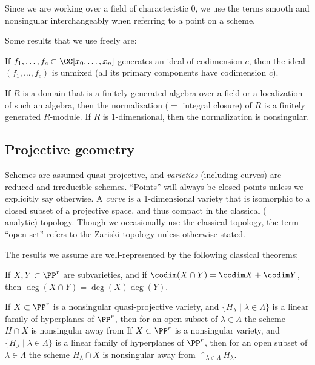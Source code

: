 Since we are working over  a field of characteristic 0, we use the terms smooth and nonsingular interchangeably when
referring to a point on a scheme.

Some results that we use freely are:
 \begin{theorem}\label{Lasker}
If $f_1,\dots, f_c \subset \CC[x_0,\dots, x_n]$ generates an ideal of codimension $c$, then 
the ideal $(f_1,\dots, f_c)$ is unmixed (all its primary components have codimension $c$).
\end{theorem}

\begin{theorem}\label{finiteness of normalization}
 If $R$ is a domain that is a finitely generated algebra over a field or a localization of such an algebra, then the
normalization ($=$ integral closure) of $R$ is a finitely generated $R$-module.
If $R$ is 1-dimensional, then the normalization is nonsingular.
\end{theorem}

\subsection{Projective geometry}
Schemes are assumed quasi-projective, and \emph{varieties} (including curves) are reduced and irreducible schemes. ``Points'' will always be closed points unless we explicitly say otherwise. A \emph{curve} is a 1-dimensional variety that is isomorphic to a closed subset of a projective space, and thus compact in the classical ($=$ analytic) topology. Though we occasionally use the classical topology, 
the term ``open set'' refers to the Zariski topology unless otherwise stated.

The results we assume are
 well-represented by the following classical theorems:

\begin{theorem}
If $X,Y\subset \PP^r$ are subvarieties, and if $\codim(X\cap Y) = \codim X + \codim Y$,
then $\deg (X\cap Y) = \deg(X)\deg(Y)$.
\end{theorem}

\begin{theorem}\label{Bertini}
If $X\subset \PP^r$  is a nonsingular quasi-projective variety, and $\{H_\lambda \mid \lambda\in \Lambda\}$ is a linear family of hyperplanes of $\PP^r$, then for an open subset of $\lambda\in \Lambda$ the scheme $H\cap X$ is nonsingular away from 
If $X\subset \PP^r$  is a nonsingular variety, and $\{H_\lambda \mid \lambda\in \Lambda\}$ is a linear family of hyperplanes of $\PP^r$, then for an open subset of $\lambda\in \Lambda$ the scheme $H_\lambda \cap X$ is nonsingular away from 
$
\cap_{\lambda \in \Lambda} H_\lambda.
$
\end{theorem}

